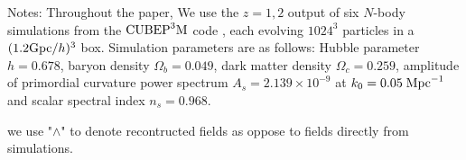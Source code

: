 Notes: 
Throughout the paper, We use the $z=1,2$ output of six $N$-body simulations from the
$\mathrm{CUBEP}^3\mathrm{M}$ code \cite{2013:code}, each evolving $1024^3$ particles in a $(1.2\mathrm{Gpc}/h)^3$ box. 
Simulation parameters are as follows: Hubble parameter $h=0.678$, baryon
density $\Omega_{b}=0.049$, dark matter density $\Omega_{c}=0.259$,
amplitude of primordial curvature power spectrum $A_s=2.139\times10^{-9}$ at 
$k_0=0.05\;\mathrm{Mpc}^{-1}$ and scalar spectral index $n_s=0.968$.

we use "$\wedge$" to denote recontructed fields as 
oppose to fields directly from simulations.
